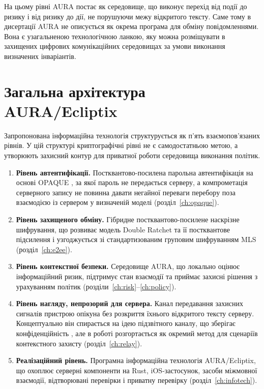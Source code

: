 На цьому рівні AURA постає як середовище, що виконує перехід від події до ризику і від ризику до дії, не порушуючи межу відкритого тексту. Саме тому в дисертації AURA не описується як окрема програма для обміну повідомленнями. Вона є узагальненою технологічною ланкою, яку можна розміщувати в захищених цифрових комунікаційних середовищах за умови виконання визначених інваріантів.

\section{Загальна архітектура AURA/Ecliptix}
\label{sec:architecture}

Запропонована інформаційна технологія структурується як п'ять взаємопов'язаних рівнів. У цій структурі криптографічні рівні не є самодостатньою метою, а утворюють захисний контур для приватної роботи середовища виконання політик.

\begin{enumerate}
  \item \textbf{Рівень автентифікації.} Постквантово-посилена парольна автентифікація на основі OPAQUE \cite{jarecki2018opaque,rfc9807opaque}, за якої пароль не передається серверу, а компрометація серверного запису не повинна давати негайної переваги перебору поза взаємодією із сервером у визначеній моделі (розділ~\ref{ch:opaque}).
  \item \textbf{Рівень захищеного обміну.} Гібридне постквантово-посилене наскрізне шифрування, що розвиває модель Double Ratchet \cite{perrin2016doubleratchet} та її постквантове підсилення \cite{kret2023pqxdh} і узгоджується зі стандартизованим груповим шифруванням MLS \cite{rfc9420} (розділ~\ref{ch:e2ee}).
  \item \textbf{Рівень контекстної безпеки.} Середовище AURA, що локально оцінює інформаційний ризик, підтримує стан взаємодії та приймає захисні рішення з урахуванням політик (розділи~\ref{ch:risk}--\ref{ch:policy}).
  \item \textbf{Рівень нагляду, непрозорий для сервера.} Канал передавання захисних сигналів пристрою опікуна без розкриття їхнього відкритого тексту серверу. Концептуально він спирається на ідею підзвітного каналу, що зберігає конфіденційність \cite{grubbs2017franking}, але в роботі розгортається як окремий метод для сценаріїв контекстного захисту (розділ~\ref{ch:relay}).
  \item \textbf{Реалізаційний рівень.} Програмна інформаційна технологія AURA/Ecliptix, що охоплює серверні компоненти на Rust, iOS-застосунок, засоби міжмовної взаємодії, відтворювані перевірки і приватну перевірку (розділ~\ref{ch:infotech}).
\end{enumerate}

